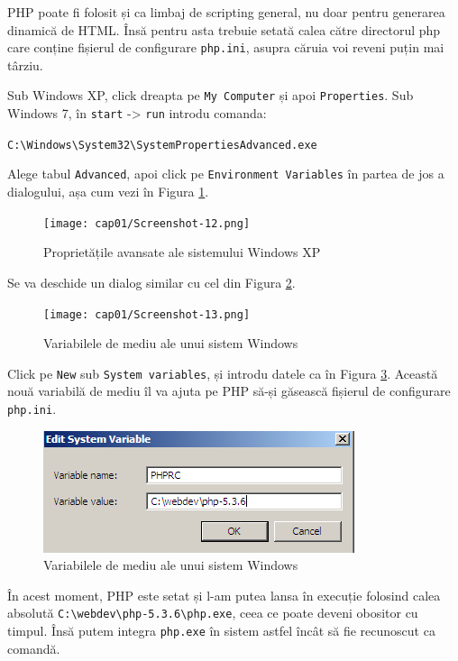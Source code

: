 PHP poate fi folosit și ca limbaj de scripting general, nu doar pentru
generarea dinamică de HTML. Însă pentru asta trebuie setată calea
către directorul php care conține fișierul de configurare \texttt{php.ini},
asupra căruia voi reveni puțin mai târziu.

Sub Windows XP, click dreapta pe \texttt{My Computer} și apoi \texttt{Properties}.
Sub Windows 7, în \texttt{start} -> \texttt{run} introdu comanda:

\texttt{C:{\textbackslash}Windows{\textbackslash}System32{\textbackslash}SystemPropertiesAdvanced.exe}

Alege tabul \texttt{Advanced}, apoi click pe \texttt{Environment Variables} în partea de jos
a dialogului, așa cum vezi în Figura \ref{fig:win adv props}.
\begin{figure}[ht!]
  \centering
    \texttt{[image: cap01/Screenshot-12.png]}
  \caption{Proprietățile avansate ale sistemului Windows XP}
  \label{fig:win adv props}
\end{figure}

Se va deschide un dialog similar cu cel din Figura \ref{img:win env vars}.
\begin{figure}[ht!]
  \centering
    \texttt{[image: cap01/Screenshot-13.png]}
  \caption{Variabilele de mediu ale unui sistem Windows}
  \label{img:win env vars}
\end{figure}

Click pe \texttt{New} sub \texttt{System variables}, și introdu datele ca în
Figura \ref{img:win new env var}. Această nouă variabilă de mediu
îl va ajuta pe PHP să-și găsească fișierul de configurare \texttt{php.ini}.
\begin{figure}[ht!]
  \centering
    \includegraphics[width=180bp]{cap01/Screenshot-14.png}
  \caption{Variabilele de mediu ale unui sistem Windows}
  \label{img:win new env var}
\end{figure}

În acest moment, PHP este setat și l-am putea lansa în execuție folosind
calea absolută
\texttt{C:{\textbackslash}webdev{\textbackslash}php-5.3.6{\textbackslash}php.exe}, ceea ce
poate deveni obositor cu timpul. Însă putem integra \texttt{php.exe}
în sistem astfel încât să fie recunoscut ca comandă.

